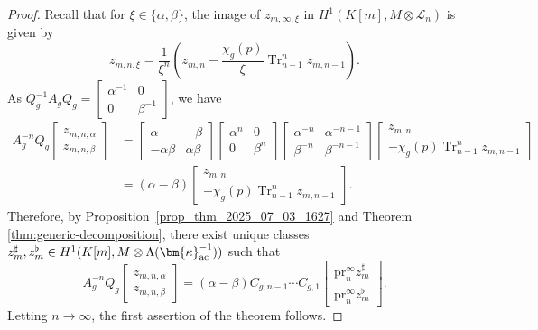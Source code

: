 \documentclass{amsart}
\numberwithin{equation}{section}
\newcommand{\pr}{\mathrm{pr}}
\newcommand{\Tr}{\operatorname{Tr}}
\newcommand{\ac}{\textup{ac}}
\newcommand{\LL}{\Lambda}
\newcommand{\bk}{(\bm{\kappa}_{\ac}^{-1})}
\newcommand{\sL}{\mathscr{L}}
\begin{document}
\begin{proof}
Recall that for $\xi\in\{\alpha,\beta\}$, the image of $ z_{m,\infty,\xi}$ in $H^1(K[m],M\otimes\sL_n)$ is given by
\[z_{m,n,\xi}=\frac{1}{\xi^{n}}\left(z_{m,n}-\frac{\chi_g(p)}{\xi}\Tr_{n-1}^nz_{m,n-1}\right).\]
As $Q_g^{-1}A_gQ_g=\begin{bmatrix}
    \alpha^{-1}&0\\0&\beta^{-1}
\end{bmatrix}$, we have
\begin{align*}
A_g^{-n}Q_g\begin{bmatrix}
    z_{m,n,\alpha}\\z_{m,n,\beta}
\end{bmatrix}&=\begin{bmatrix}
    \alpha&-\beta\\-\alpha\beta&\alpha\beta
\end{bmatrix}\begin{bmatrix}
    \alpha^{n}&0\\0&\beta^{n}
\end{bmatrix}\begin{bmatrix}
    \alpha^{-n}&\alpha^{-n-1}\\  \beta^{-n}&\beta^{-n-1}
\end{bmatrix}\begin{bmatrix}
    z_{m,n}\\-\chi_g(p) \Tr_{n-1}^nz_{m,n-1}
\end{bmatrix}\\
    &=(\alpha-\beta)\begin{bmatrix}
    z_{m,n}\\-\chi_g(p) \Tr_{n-1}^nz_{m,n-1}
\end{bmatrix}.
\end{align*}
Therefore, by Proposition~\ref{prop_thm_2025_07_03_1627} and Theorem \ref{thm:generic-decomposition}, there exist unique classes $z_m^\sharp,z_m^\flat\in H^1(K[m],M\otimes\LL\bk)$ such that 
\[
A_g^{-n}Q_g\begin{bmatrix}
    z_{m,n,\alpha}\\z_{m,n,\beta}
\end{bmatrix}=(\alpha-\beta)C_{g,n-1}\cdots C_{g,1}\begin{bmatrix}
\pr_n^\infty z_m^\sharp\\ \pr_n^\infty z_m^\flat
\end{bmatrix}.
\]
Letting $n\rightarrow \infty$, the first assertion of the theorem follows.


\end{proof}
\end{document}
